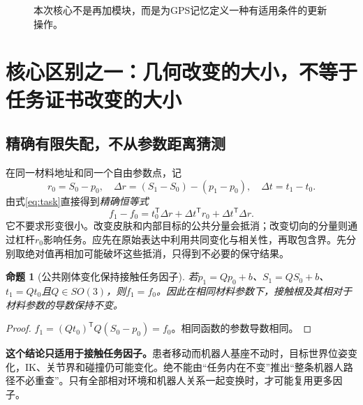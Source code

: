 \documentclass[UTF8,11pt,a4paper,fontset=fandol]{ctexart}
\numberwithin{equation}{section}
\newtheorem{proposition}[theorem]{命题}
\theoremstyle{definition}
\newcommand{\T}{^{\mathsf T}}
\begin{document}
\begin{figure}[H]\centering
{}
\caption{本次核心不是再加模块，而是为GPS记忆定义一种有适用条件的更新操作。}
\end{figure}

\section{核心区别之一：几何改变的大小，不等于任务证书改变的大小}
\subsection{精确有限失配，不从参数距离猜测}
在同一材料地址和同一个自由参数点，记
\begin{equation}
 r_0=S_0-p_0,\quad
 \Delta r=(S_1-S_0)-(p_1-p_0),\quad
 \Delta t=t_1-t_0.
\end{equation}
由式\eqref{eq:task}直接得到\emph{精确恒等式}
\begin{equation}
 \boxed{f_1-f_0=t_0\T\Delta r+\Delta t\T r_0+\Delta t\T\Delta r.}
 \label{eq:deltaf}
\end{equation}
它不要求形变很小。改变皮肤和内部目标的公共分量会抵消；改变切向的分量则通过杠杆$r_0$影响任务。应先在原始表达中利用共同变化与相关性，再取包含界。先分别取绝对值再相加可能破坏这些抵消，只得到不必要的保守结果。

\begin{proposition}[公共刚体变化保持接触任务因子]
若$p_1=Qp_0+b$、$S_1=QS_0+b$、$t_1=Qt_0$且$Q\in SO(3)$，则$f_1=f_0$。因此在相同材料参数下，接触根及其相对于材料参数的导数保持不变。
\end{proposition}
\begin{proof}
$f_1=(Qt_0)\T Q(S_0-p_0)=f_0$。相同函数的参数导数相同。
\end{proof}
\textbf{这个结论只适用于接触任务因子。}患者移动而机器人基座不动时，目标世界位姿变化，IK、关节界和碰撞仍可能变化。绝不能由“任务内在不变”推出“整条机器人路径不必重查”。只有全部相对环境和机器人关系一起变换时，才可能复用更多因子。
\end{document}
